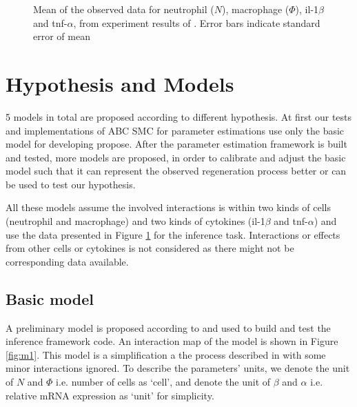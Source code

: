\documentclass[12pt,a4paper]{report}
\begin{document}
\begin{figure}
\begin{center}
\end{center}

\caption[Mean of the observed data]%
{Mean of the observed data for neutrophil ($N$), macrophage ($\Phi$), il-1$\beta$ and tnf-$\alpha$, from experiment results of \cite{ref:Tsarouchas}. Error bars indicate standard error of mean} 
\label{fig:obs_data}

\end{figure}

\section{Hypothesis and Models}

5 models in total are proposed according to different hypothesis. At first our tests and implementations of ABC SMC for parameter estimations use only the basic model for developing propose. After the parameter estimation framework is built and tested, more models are proposed, in order to calibrate and adjust the basic model such that it can represent the observed regeneration process better or can be used to test our hypothesis. 

All these models assume the involved interactions is within two kinds of cells (neutrophil and macrophage) and two kinds of cytokines (il-1$\beta$ and tnf-$\alpha$) and use the data presented in Figure \ref{fig:obs_data} for the inference task. Interactions or effects from other cells or cytokines is not considered as there might not be corresponding data available.

\subsection{Basic model}

A preliminary model is proposed according to \cite{ref:Tsarouchas} and used to build and test the inference framework code. An interaction map of the model is shown in Figure \ref{fig:m1}. This model is a simplification a the process described in \cite{ref:Tsarouchas} with some minor interactions ignored. To describe the parameters' units, we denote the unit of $N$ and $\Phi$ i.e. number of cells as `cell', and denote the unit of $\beta$ and $\alpha$ i.e. relative mRNA expression as `unit' for simplicity.
\end{document}
